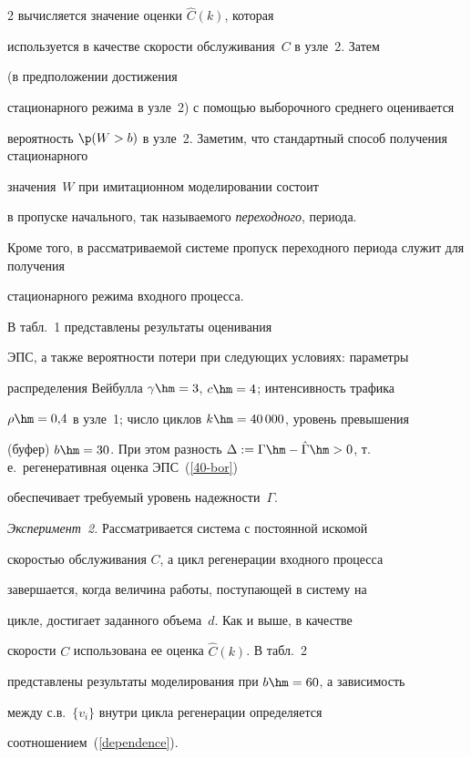 \begin{multicols}{2}
вычисляется  значение  оценки $\hat{C}(k)$, которая

используется  в качестве скорости обслуживания~$C$ в узле~2.  Затем

(в предположении достижения

 стационарного режима в узле~2) с помощью выборочного среднего   оценивается

 вероятность $\p(W>b)$ в узле~2.  Заметим, что стандартный способ  получения стационарного

 значения~$W$  при имитационном моделировании состоит

  в пропуске начального, так называемого {\it  переходного},  периода.

 Кроме того, в рассматриваемой системе  пропуск  переходного  периода служит для   получения

 стационарного режима входного процесса.



 В табл.~1 представлены результаты оценивания

ЭПС, а также вероятности потери  при следующих условиях: параметры

распределения Вейбулла $\gamma \hm= 3$, $c\hm=4$; интенсивность трафика

$\rho\hm=0{,}4$ в узле~1; число циклов  $k\hm=40\,000$, уровень превышения

(буфер) $b\hm=30$. При этом разность  $\Delta: = \Gamma \hm-

\hat\Gamma\hm>0$, т.\,е.\ регенеративная оценка ЭПС~(\ref{40-bor})

обеспечивает требуемый  уровень надежности~$\Gamma$.






{\it Эксперимент~2.} Рассматривается  система с постоянной искомой

скоростью обслуживания $C$, а   цикл регенерации входного процесса

завершается, когда   величина работы, поступающей в систему на

цикле, достигает заданного объема~$d$. Как и выше,  в качестве

скорости $C$ использована ее оценка $\hat{C}(k)$. В табл.~2

представлены результаты моделирования при  $b\hm=60$, а зависимость

между с.в.\ $\{v_i\}$ внутри цик\-ла регенерации определяется

соотношением~(\ref{dependence}).










\end{multicols}
